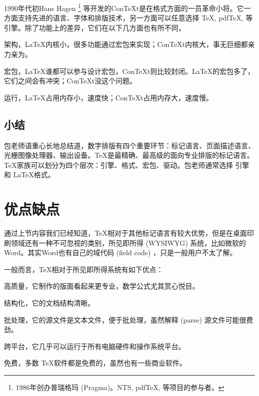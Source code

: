 1990年代初Hans Hagen\indexHagen{} \footnote{1986年创办普瑞格玛 (Pragma)\indexPragma。NTS, pdfTeX, \LuaTeX 等项目的参与者。} 等开发的Con\TeX t是在格式方面的一员革命小将。它一方面支持先进的语言、字体和排版技术，另一方面可以任意选择 \TeX, pdfTeX, \LuaTeX 等引擎。除了功能上的差异，它们在以下几方面也有所不同，

\begin{compactitem}
    \item 架构，\LaTeX 内核小，很多功能通过宏包来实现；Con\TeX t内核大，事无巨细都亲力亲为。
    \item 宏包，\LaTeX 谁都可以参与设计宏包，Con\TeX t则比较封闭。\LaTeX 的宏包多了，它们之间会有冲突；Con\TeX t没这个问题。
    \item 运行，\LaTeX 占用内存小，速度快；Con\TeX t占用内存大，速度慢。
\end{compactitem}

\subsection{小结}

包老师语重心长地总结道，数字排版有四个重要环节：标记语言、页面描述语言、光栅图像处理器、输出设备。\TeX 是最精确、最高级的面向专业排版的标记语言。\TeX 家族可以划分为四个层次：引擎、格式、宏包、驱动。包老师通常选择 \XeTeX 引擎和 \LaTeX 格式。

\section{优点缺点}

通过上节内容我们已经知道，\TeX 相对于其他标记语言有较大优势，但是在桌面印刷领域还有一种不可忽视的类别，所见即所得 (WYSIWYG) 系统，比如微软的Word。其实Word也有自己的域代码 (field code) ，只是一般用户不太了解。

一般而言，\TeX 相对于所见即所得系统有如下优点：
\begin{compactitem}
   \item 高质量，它制作的版面看起来更专业，数学公式尤其赏心悦目。
   \item 结构化，它的文档结构清晰。
   \item 批处理，它的源文件是文本文件，便于批处理，虽然解释 (parse) 源文件可能很费劲。
   \item 跨平台，它几乎可以运行于所有电脑硬件和操作系统平台。
   \item 免费，多数 \TeX 软件都是免费的，虽然也有一些商业软件。
\end{compactitem}

